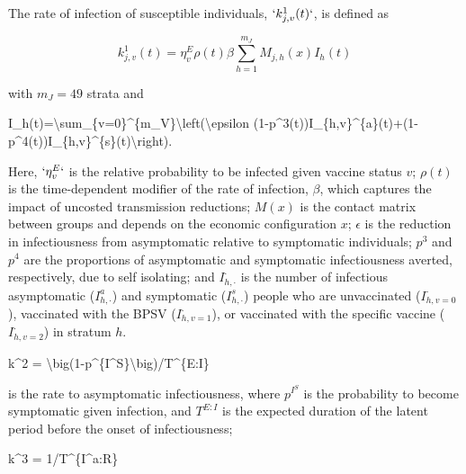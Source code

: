\documentclass[
]{article}
\newenvironment{Shaded}{\begin{snugshade}}{\end{snugshade}}
\newcommand{\NormalTok}[1]{#1}
\begin{document}
The rate of infection of susceptible individuals, \(`k^{1}_{j,v}(t)`\), is defined as

\begin{equation}
k_{j,v}^{1}(t) = \eta_{v}^{E}\rho(t)\beta\sum_{h=1}^{m_J}M_{j,h}(x) I_h(t)
\label{eq:infection}
\end{equation}

with \(m_J=49\) strata and

\begin{Shaded}
\begin{Highlighting}[]
\NormalTok{ I\_h(t)=\textbackslash{}sum\_\{v=0\}\^{}\{m\_V\}\textbackslash{}left(\textbackslash{}epsilon (1{-}p\^{}3(t))I\_\{h,v\}\^{}\{a\}(t)+(1{-}p\^{}4(t))I\_\{h,v\}\^{}\{s\}(t)\textbackslash{}right). }
\end{Highlighting}
\end{Shaded}

Here, \(`\eta^{E}_{v}`\) is the relative probability to be infected given vaccine status \(v\); \(\rho(t)\) is the time-dependent modifier of the rate of infection, \(\beta\), which captures the impact of uncosted transmission reductions; \(M(x)\) is the contact matrix between groups and depends on the economic configuration \(x\); \(\epsilon\) is the reduction in infectiousness from asymptomatic relative to symptomatic individuals; \(p^3\) and \(p^4\) are the proportions of asymptomatic and symptomatic infectiousness averted, respectively, due to self isolating; and \(I_{h,\cdot}^{\cdot}\) is the number of infectious asymptomatic (\(I_{h,\cdot}^{a}\)) and symptomatic (\(I_{h,\cdot}^{s}\)) people who are unvaccinated (\(I_{h,v=0}^{\cdot}\)), vaccinated with the BPSV (\(I_{h,v=1}^{\cdot}\)), or vaccinated with the specific vaccine (\(I_{h,v=2}^{\cdot}\)) in stratum \(h\).

\begin{Shaded}
\begin{Highlighting}[]
\NormalTok{ k\^{}2 = \textbackslash{}big(1{-}p\^{}\{I\^{}S\}\textbackslash{}big)/T\^{}\{E:I\} }
\end{Highlighting}
\end{Shaded}

is the rate to asymptomatic infectiousness, where \(p^{I^S}\) is the probability to become symptomatic given infection, and \(T^{E:I}\) is the expected duration of the latent period before the onset of infectiousness;

\begin{Shaded}
\begin{Highlighting}[]
\NormalTok{ k\^{}3 = 1/T\^{}\{I\^{}a:R\}  }
\end{Highlighting}
\end{Shaded}
\end{document}
